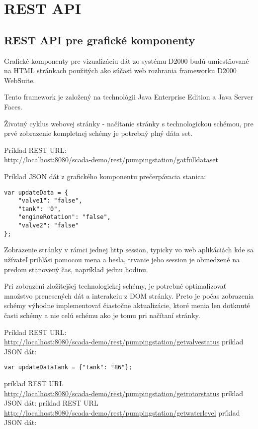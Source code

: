 \chapter{REST API}

\section{REST API pre grafické komponenty}
Grafické komponenty pre vizualizáciu dát zo systému D2000 budú umiestňované na HTML stránkach použitých ako súčasť web rozhrania frameworku D2000 WebSuite.

Tento framework je založený na technológii Java Enterprise Edition a Java Server Faces.

Životný cyklus webovej stránky - načítanie stránky s technologickou schémou, pre prvé zobrazenie kompletnej schémy je potrebný plný dáta set.


Príklad REST URL:\\
\url{http://localhost:8080/scada-demo/rest/pumpingstation/gatfulldataset}


Príklad JSON dát z grafického komponentu prečerpávacia stanica: 
\begin{lstlisting}
var updateData = {
	"valve1": "false",
	"tank": "0",
	"engineRotation": "false",
	"valve2": "false"
};
\end{lstlisting}


Zobrazenie stránky v rámci jednej http session, typicky vo web aplikáciách kde sa užívateľ prihlási pomocou mena a hesla, trvanie jeho session je obmedzené na predom stanovený čas, napríklad jednu hodinu.


Pri zobrazení zložitejšej technologickej schémy, je potrebné optimalizovať množstvo prenesených dát a interakciu z DOM stránky. Preto je počas zobrazenia schémy výhodne implementovať čiastočne aktualizácie, ktoré menia len dotknuté časti schémy a nie celú schému ako je tomu pri načítaní stránky.  

Príklad REST URL:\\ 
\url{http://localhost:8080/scada-demo/rest/pumpingstation/getvalvestatus}
príklad JSON dát:
\begin{lstlisting}
var updateDataTank = {"tank": "86"};
\end{lstlisting}

príklad REST URL\\ \url{http://localhost:8080/scada-demo/rest/pumpingstation/getrotorstatus}
príklad JSON dát: %
príklad REST URL\\ \url{http://localhost:8080/scada-demo/rest/pumpingstation/getwaterlevel}
príklad JSON dát: %


